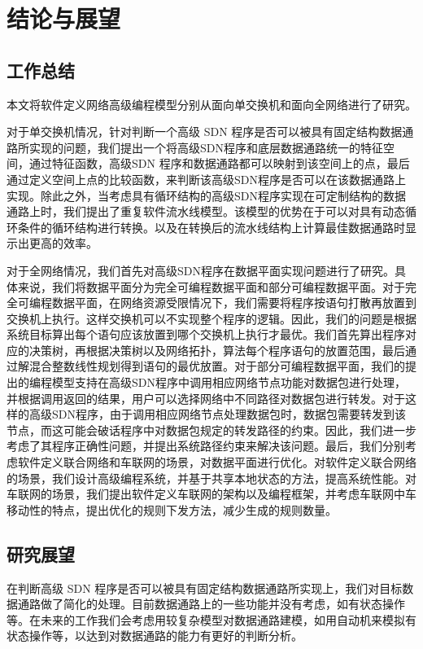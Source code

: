 \chapter{结论与展望}

\section{工作总结}

本文将软件定义网络高级编程模型分别从面向单交换机和面向全网络进行了研究。

对于单交换机情况，针对判断一个高级 SDN 程序是否可以被具有固定结构数据通路所实现的问题，我们提出一个将高级SDN程序和底层数据通路统一的特征空间，通过特征函数，高级SDN 程序和数据通路都可以映射到该空间上的点，最后通过定义空间上点的比较函数，来判断该高级SDN程序是否可以在该数据通路上实现。除此之外，当考虑具有循环结构的高级SDN程序实现在可定制结构的数据通路上时，我们提出了重复软件流水线模型。该模型的优势在于可以对具有动态循环条件的循环结构进行转换。以及在转换后的流水线结构上计算最佳数据通路时显示出更高的效率。

对于全网络情况，我们首先对高级SDN程序在数据平面实现问题进行了研究。具体来说，我们将数据平面分为完全可编程数据平面和部分可编程数据平面。对于完全可编程数据平面，在网络资源受限情况下，我们需要将程序按语句打散再放置到交换机上执行。这样交换机可以不实现整个程序的逻辑。因此，我们的问题是根据系统目标算出每个语句应该放置到哪个交换机上执行才最优。我们首先算出程序对应的决策树，再根据决策树以及网络拓扑，算法每个程序语句的放置范围，最后通过解混合整数线性规划得到语句的最优放置。对于部分可编程数据平面，我们的提出的编程模型支持在高级SDN程序中调用相应网络节点功能对数据包进行处理，并根据调用返回的结果，用户可以选择网络中不同路径对数据包进行转发。对于这样的高级SDN程序，由于调用相应网络节点处理数据包时，数据包需要转发到该节点，而这可能会破话程序中对数据包规定的转发路径的约束。因此，我们进一步考虑了其程序正确性问题，并提出系统路径约束来解决该问题。最后，我们分别考虑软件定义联合网络和车联网的场景，对数据平面进行优化。对软件定义联合网络的场景，我们设计高级编程系统，并基于共享本地状态的方法，提高系统性能。对车联网的场景，我们提出软件定义车联网的架构以及编程框架，并考虑车联网中车移动性的特点，提出优化的规则下发方法，减少生成的规则数量。


\section{研究展望}

在判断高级 SDN 程序是否可以被具有固定结构数据通路所实现上，我们对目标数据通路做了简化的处理。目前数据通路上的一些功能并没有考虑，如有状态操作等。在未来的工作我们会考虑用较复杂模型对数据通路建模，如用自动机来模拟有状态操作等，以达到对数据通路的能力有更好的判断分析。

